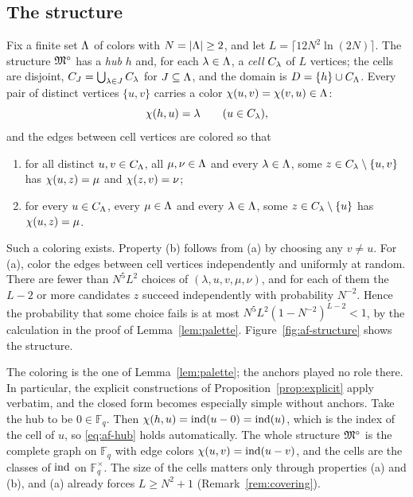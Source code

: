 \subsection{The structure}\label{app:af-structure}
Fix a finite set $\Lambda$ of colors with $N=|\Lambda|\ge2$, and let
$L=\lceil12N^2\ln(2N)\rceil$. The structure $\mathfrak M^\circ$ has a \emph{hub}
$h$ and, for each $\lambda\in\Lambda$, a \emph{cell} $C_{\lambda}$ of $L$
vertices; the cells are disjoint, $C_{J}=\bigcup_{\lambda\in J}C_{\lambda}$
for $J\subseteq\Lambda$, and the domain is $D=\{h\}\cup C_{\Lambda}$. Every pair of
distinct vertices $\{u,v\}$ carries a color $\chi(u,v)=\chi(v,u)\in\Lambda$:
\begin{equation}\label{eq:af-hub}
 \chi(h,u)=\lambda\qquad(u\in C_{\lambda}),
\end{equation}
and the edges between cell vertices are colored so that
\begin{enumerate}[nosep,label=(\alph*)]
\item for all distinct $u,v\in C_{\Lambda}$, all $\mu,\nu\in\Lambda$ and every
 $\lambda\in\Lambda$, some $z\in C_{\lambda}\setminus\{u,v\}$ has
 $\chi(u,z)=\mu$ and $\chi(z,v)=\nu$;
\item for every $u\in C_{\Lambda}$, every $\mu\in\Lambda$ and every
 $\lambda\in\Lambda$, some $z\in C_{\lambda}\setminus\{u\}$ has
 $\chi(u,z)=\mu$.
\end{enumerate}
Such a coloring exists. Property (b) follows from (a) by choosing any
$v\ne u$. For (a), color the edges between cell vertices independently and
uniformly at random. There are fewer than $N^5L^2$ choices of
$(\lambda,u,v,\mu,\nu)$, and for each of them the $L-2$ or more candidates
$z$ succeed independently with probability $N^{-2}$. Hence the probability
that some choice fails is at most
$N^5L^2(1-N^{-2})^{L-2}<1$, by the calculation in the proof of
Lemma~\ref{lem:palette}. Figure~\ref{fig:af-structure} shows the structure.

The coloring is the one of Lemma~\ref{lem:palette}; the anchors played
no role there. In particular, the explicit constructions of
Proposition~\ref{prop:explicit} apply verbatim, and the closed form becomes
especially simple without anchors. Take the hub to be $0\in\mathbb F_q$.
Then $\chi(h,u)=\operatorname{ind}(u-0)=\operatorname{ind}(u)$, which is the index of the cell of
$u$, so \eqref{eq:af-hub} holds automatically. The whole structure
$\mathfrak M^\circ$ is the complete graph on $\mathbb F_q$ with edge colors
$\chi(u,v)=\operatorname{ind}(u-v)$, and the cells are the classes of $\operatorname{ind}$ on
$\mathbb F_q^\times$. The size of the cells matters only through
properties (a) and (b), and (a) already forces $L\ge N^2+1$
(Remark~\ref{rem:covering}).

